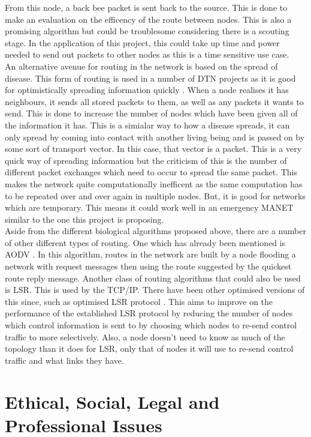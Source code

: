 \documentclass{report}
\begin{document}
From this node, a back bee packet is sent back to the source. This is done to make an evaluation on the efficency of the route between nodes. This is also a promising algorithm but 
could be troublesome considering there is a scouting stage. In the application of this project, this could take up time and power needed to send out packets to other nodes as 
this is a time sensitive use case.
\bigskip\\
An alternative avenue for routing in the network is based on the spread of disease. This form of routing is used in a number of DTN projects as it is good for optimistically 
spreading information quickly \cite{choksatid2016efficient}. When a node realises it has neighbours, it sends all stored packets to them, as well as any packets it wants to 
send. This is done to increase the number of nodes which have been given all of the information it has. This is a simialar way to how a disease spreads, it can only spread 
by coming into contact with another living being and is passed on by some sort of transport vector. In this case, that vector is a packet. This is a very quick way of spreading 
information but the criticism of this is the number of different packet exchanges which need to occur to spread the same packet. This makes the network quite computationally 
inefficent as the same computation has to be repeated over and over again in multiple nodes. But, it is good for networks which are temporary. This means it could work well 
in an emergency MANET similar to the one this project is proposing.  
\bigskip\\
Aside from the different biological algorithms proposed above, there are a number of other different types of routing. One which has already been mentioned is AODV \cite{phong2010enhancing}.
In this algorithm, routes in the network are built by a node flooding a network with request messages then using the route suggested by the quickest route reply message. Another 
class of routing algorithms that could also be used is LSR. This is used by the TCP/IP. There have been other optimised versions of this since, such as 
optimised LSR protocol \cite{OLSRP}. This aims to improve on the performance of the established LSR protocol by reducing the number of nodes which control information is sent to 
by choosing which nodes to re-send control traffic to more selectively. Also, a node doesn't need to know as much of the topology than it does for LSR, only that of nodes  
it will use to re-send control traffic and what links they have.

\chapter*{Ethical, Social, Legal and Professional Issues}
\end{document}
